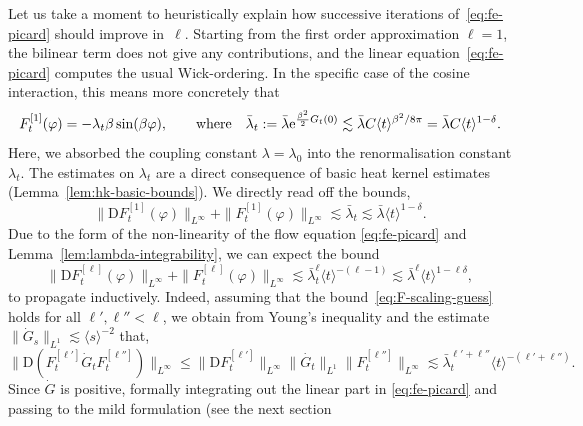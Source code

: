 \documentclass[11pt, a4paper]{scrartcl}
\numberwithin{equation}{section}
\theoremstyle{plain}
\theoremstyle{remark}
\newcommand{\assign}{:=}
\newcommand{\mathD}{\mathrm{D}}
\newcommand{\mathe}{\mathrm{e}}
\begin{document}
Let us take a moment to heuristically explain how successive iterations
of~\eqref{eq:fe-picard} should improve in~$\ell$. Starting from the first
order approximation $\ell = 1$, the bilinear term does not give any
contributions, and the linear equation~\eqref{eq:fe-picard} computes the usual
Wick-ordering. In the specific case of the cosine interaction, this means more
concretely that
\begin{equation}
  F^{[1]}_t (\varphi) = - \lambda_t \beta \sin (\beta \varphi)
  \label{eq:F1-explicit}, \qquad \text{where\quad} \bar{\lambda}_t \assign \bar{\lambda}
  \mathe^{\frac{\beta^2}{2} G_t (0)} \lesssim \bar{\lambda} C \langle t
  \rangle^{\beta^2 / 8 \pi} = \bar{\lambda} C \langle t \rangle^{1 - \delta} .
\end{equation}
Here, we absorbed the coupling constant $\lambda = \lambda_0$ into the
renormalisation constant $\lambda_t$. The estimates on $\lambda_t$ are a
direct consequence of basic heat kernel estimates
(Lemma~\ref{lem:hk-basic-bounds}). We directly read off the bounds,
\begin{equation}
  \| \mathD F_t^{[1]} (\varphi) \|_{L^{\infty}} + \| F_t^{[1]} (\varphi)
  \|_{L^{\infty}} \lesssim \bar{\lambda}_t \lesssim \bar{\lambda} \langle t \rangle^{1 -
  \delta} . \label{eq:F1-scaling}
\end{equation}
Due to the form of the non-linearity of the flow equation \eqref{eq:fe-picard}
and Lemma~\ref{lem:lambda-integrability}, we can expect the bound
\begin{equation}
  \| \mathD F^{[\ell]}_t (\varphi) \|_{L^{\infty}} + \| F^{[\ell]}_t (\varphi)
  \|_{L^{\infty}} \lesssim \bar{\lambda}_t^{\ell} \langle t \rangle^{- (\ell - 1)}
  \lesssim \bar{\lambda}^{\ell} \langle t \rangle^{1 - \ell \delta},
  \label{eq:F-scaling-guess}
\end{equation}
to propagate inductively. Indeed, assuming that the
bound~\eqref{eq:F-scaling-guess} holds for all $\ell', \ell'' < \ell$, we
obtain from Young's inequality and the estimate $\| \dot{G}_s \|_{L^1}
\lesssim \langle s \rangle^{- 2}$ that,
\begin{equation}
  \| \mathD (F_t^{[\ell']}  \dot{G}_t F^{[\ell'']}_t) \|_{L^{\infty}}
  \leqslant \| \mathD F_t^{[\ell']} \|_{L^{\infty}} \| \dot{G_t} \|_{L^1} \|
  F_t^{[\ell'']} \|_{L^{\infty}} \lesssim \bar{\lambda}_t^{\ell' + \ell''} \langle t
  \rangle^{- (\ell' + \ell'')} \label{eq:DFGF-young} .
\end{equation}
Since $\dot{G}$ is positive, formally integrating out the linear part in
\eqref{eq:fe-picard} and passing to the mild formulation (see the next section
\end{document}
